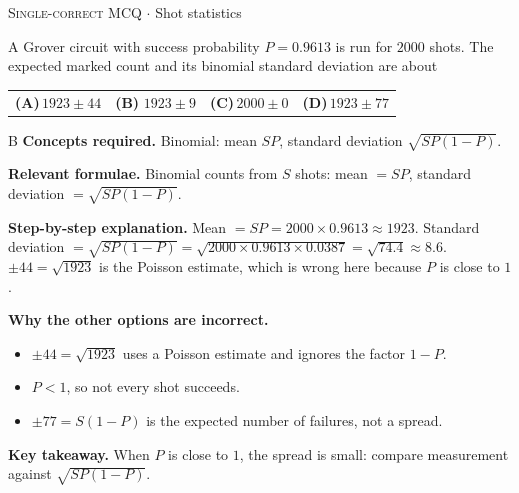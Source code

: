 \documentclass[11pt,a4paper]{article}
\newcommand{\optlabel}[1]{\textbf{(#1)}}
\newcommand{\correctlabel}[1]{\textcolor{okgreen}{\textbf{(#1)}\,\ding{51}}}
\newenvironment{qitem}[1]{\begin{list}{}{\setlength{\leftmargin}{3.3em}\setlength{\labelwidth}{3.1em}%
  \setlength{\labelsep}{0.2em}\setlength{\topsep}{3pt}\setlength{\parsep}{3pt}}\item[\textbf{Q.#1}\hfill]}{\end{list}}
\newcommand{\qsep}{\par\vspace{2pt}{\color{black!15}\hrule}\vspace{4pt}}
\newcommand{\qmeta}[2]{{\footnotesize\color{black!60}\textsc{#1} \;$\cdot$\; #2}\par}
\begin{document}
\begin{qitem}{54}
\qmeta{Single-correct MCQ}{Shot statistics}
A Grover circuit with success probability $P = 0.9613$ is run for $2000$ shots. The expected marked count and its binomial standard deviation are about
\par\smallskip\noindent\begin{tabularx}{\linewidth}{@{}*{4}{L}@{}}
\optlabel{A}\,$1923 \pm 44$ & \correctlabel{B}\,$1923 \pm 9$ & \optlabel{C}\,$2000 \pm 0$ & \optlabel{D}\,$1923 \pm 77$
\end{tabularx}
\end{qitem}
\begin{solbox}{B}
\textbf{\color{brand}Concepts required.} Binomial: mean $SP$, standard deviation $\sqrt{SP(1-P)}$.

\textbf{\color{brand}Relevant formulae.} Binomial counts from $S$ shots: mean $= SP$, standard deviation $= \sqrt{SP(1 - P)}$.

\textbf{\color{brand}Step-by-step explanation.} Mean $= SP = 2000\times0.9613 \approx 1923$. Standard deviation $= \sqrt{SP(1-P)} = \sqrt{2000\times0.9613\times0.0387} = \sqrt{74.4} \approx 8.6$.
$\pm44 = \sqrt{1923}$ is the Poisson estimate, which is wrong here because $P$ is close to $1$.

\textbf{\color{brand}Why the other options are incorrect.}
\begin{itemize}[leftmargin=2.4em, itemsep=1pt, topsep=2pt]
\item[\textbf{(A)}] $\pm44 = \sqrt{1923}$ uses a Poisson estimate and ignores the factor $1 - P$.
\item[\textbf{(C)}] $P < 1$, so not every shot succeeds.
\item[\textbf{(D)}] $\pm77 = S(1-P)$ is the expected number of failures, not a spread.
\end{itemize}
\textbf{\color{brand}Key takeaway.} When $P$ is close to $1$, the spread is small: compare measurement against $\sqrt{S P(1-P)}$.
\end{solbox}
\qsep
\end{document}

